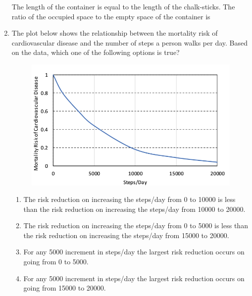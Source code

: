 \documentclass[journal,12pt,onecolumn]{IEEEtran}
\theoremstyle{remark}
\begin{document}
\begin{enumerate}
The length of the container is equal to the length of the chalk-sticks. The ratio of the occupied space to the empty space of the container is
\begin{enumerate}
\end{enumerate}
\hfill{}
 \item The plot below shows the relationship between the mortality risk of cardiovascular disease and the number of steps a person walks per day. Based on the data, which one of the following options is true?
\begin{figure}[h]
    \centering
    \includegraphics[width=0.5\columnwidth]{figs/im 2.jpeg}
    \caption{}
    \label{fig:placeholder}
\end{figure}


\begin{enumerate}
    \item The risk reduction on increasing the steps/day from 0 to 10000 is less than the risk reduction on increasing the steps/day from 10000 to 20000.
    \item The risk reduction on increasing the steps/day from 0 to 5000 is less than the risk reduction on increasing the steps/day from 15000 to 20000.
    \item For any 5000 increment in steps/day the largest risk reduction occurs on going from 0 to 5000.
    \item For any 5000 increment in steps/day the largest risk reduction occurs on going from 15000 to 20000.
\end{enumerate}
\hfill{}




\end{enumerate}
\end{document}
